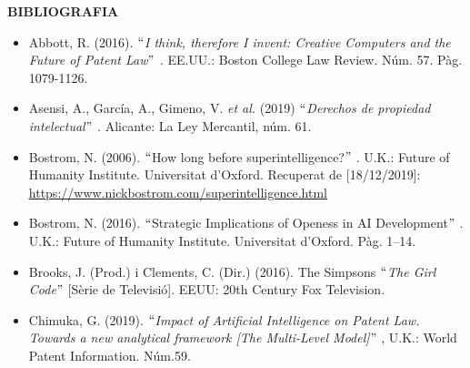 \documentclass[12pt]{article}
\renewcommand{\_}{\kern-1.5pt\textunderscore\kern-1.5pt}
\begin{document}
\begin{itemize}
\vspace{\baselineskip}
\begin{Center}
{\fontsize{16pt}{19.2pt}\selectfont \textbf{BIBLIOGRAFIA}\par}
\end{Center}\par


\vspace{\baselineskip}

\vspace{\baselineskip}
\begin{itemize}
	\item Abbott, R. (2016). \textit{$``$I think, therefore I invent: Creative Computers and the Future of Patent Law$"$ .} EE.UU.: Boston College Law Review. Núm. 57. Pàg. 1079-1126.\par


\vspace{\baselineskip}
	\item Asensi, A., García, A., Gimeno, V. \textit{et al.} (2019)\textit{ $``$Derechos de propiedad intelectual$"$ .} Alicante: La Ley Mercantil, núm. 61. \par


\vspace{\baselineskip}
	\item Bostrom, N. (2006). $``$How long before superintelligence?$"$ . U.K.: Future of Humanity Institute. Universitat d’Oxford. Recuperat de [18/12/2019]: \href{https://www.nickbostrom.com/superintelligence.html}{\textcolor[HTML]{0000FF}{\ul{https://www.nickbostrom.com/superintelligence.html}}}\par


\vspace{\baselineskip}
	\item Bostrom, N. (2016). \textit{$``$}Strategic Implications of Openess in AI Development$"$ . U.K.: Future of Humanity Institute. Universitat d’Oxford. Pàg. 1–14.\par


\vspace{\baselineskip}
	\item Brooks, J. (Prod.) i Clements, C. (Dir.) (2016). The Simpsons $``$\textit{The Girl Code}$"$  [Sèrie de Televisió]. EEUU: 20th Century Fox Television.\par


\vspace{\baselineskip}
	\item Chimuka, G. (2019). \textit{$``$Impact of Artificial Intelligence on Patent Law. Towards a new analytical framework [The Multi-Level Model]$"$ }, U.K.: World Patent Information. Núm.59. \par



\end{itemize}
\end{itemize}
\end{document}
